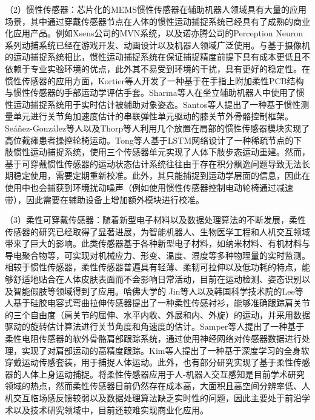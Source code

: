 （2）惯性传感器：芯片化的MEMS惯性传感器在辅助机器人领域具有大量的应用场景，其中通过穿戴传感器节点在人体的惯性运动捕捉系统已经具有了成熟的商业化应用产品。例如Xsens公司的MVN系统，以及诺亦腾公司的Perception Neuron系列动捕系统已经在游戏开发、动画设计以及机器人领域广泛使用。与基于摄像机的运动捕捉系统相比，惯性运动捕捉系统在保证捕捉精度前提下具有成本更低且不依赖于专业实验环境的优点，此外其不易受到环境的干扰，具有更好的稳定性。在惯性传感器的应用方面，Kortier等人\cite{kortierAssessmentHandKinematics2014}开发了一种基于在手指上附加柔性PCB结构与惯性传感器的手部运动学评估手套。Sharma等人\cite{sharmaBiomechanicalTrajectoryOptimization2022,sharmaPhysicalHumanRobotInteraction2022}在坐立辅助机器人中使用了惯性运动捕捉系统用于实时估计被辅助对象姿态。Santos等人\cite{dossantosIMUbasedTransparencyControl2022}提出了一种基于惯性测量单元进行关节角加速度估计的串联弹性单元驱动的膝关节外骨骼控制框架。Seáñez-González等人\cite{seanez-gonzalezStaticDynamicDecoding2017}以及Thorp等人\cite{thorpUpperBodyBasedPower2016d}利用几个放置在肩部的惯性传感器模块实现了高位截瘫患者操控轮椅运动。Tong等人\cite{tongLSTMBasedLowerLimbs2020}基于LSTM网络设计了一种稀疏节点的下肢惯性运动捕捉系统，使用三个传感器单元实现了人体下肢步态运动重建。然而，基于可穿戴惯性传感器的运动状态估计系统往往由于存在积分飘逸问题导致无法长期稳定使用，需要定期重新校准。此外，其只能捕捉到运动学层面的信息，因此在使用中也会捕获到环境扰动噪声（例如使用惯性传感器控制电动轮椅通过减速带），因此需要在辅助设备上增加额外模块进行校准。

（3）柔性可穿戴传感器：随着新型电子材料以及数据处理算法的不断发展，柔性传感器的研究已经取得了显著进展，为智能机器人、生物医学工程和人机交互领域带来了巨大的影响。此类传感器基于各种新型电子材料，如纳米材料、有机材料与导电聚合物等，可实现对机械应力、形变、温度、湿度等多种物理量的实时监测。相较于惯性传感器，柔性传感器普遍具有轻薄、柔韧可拉伸以及低功耗的特点，能够舒适地贴合在人体皮肤表面而不会影响日常活动，目前在运动检测、姿态识别以及智能假肢等领域得到了应用。哈佛大学的 Jin等人\cite{jinSoftSensingShirt2020}以及韩国科学技术院的Lee等人\cite{leePrintableSkinAdhesive2016}基于硅胶电容式弯曲拉伸传感器提出了一种柔性传感衬衫，能够准确跟踪肩关节的三个自由度（肩关节的屈伸、水平内收、外展和内、外旋）的运动，并采用数据驱动的旋转估计算法进行关节角度和角速度的估计。Samper等人\cite{samper-escuderoEfficientMultiaxialShoulderMotion2020}提出了一种基于柔性电阻传感器的软外骨骼肩部跟踪系统，通过使用神经网络对传感器数据进行处理，实现了对肩部运动的高精度跟踪。Kim等人\cite{kimDeepFullBodyMotion2019}提出了一种基于深度学习的全身软穿戴运动传感套装，用于捕捉人体运动。此外，也有部分研究\cite{contreras-gonzalezEfficientUpperLimb2020,ogataEstimatingMovementsHuman2019}实现了基于柔性传感器的人体上身运动捕捉。将柔性传感器应用于人-机器人交互感知是目前学术研究领域的热点，然而柔性传感器目前仍然存在成本高，大面积且高空间分辨率低、人机交互临场感反馈较弱以及数据处理算法缺乏实时性的问题，因此主要处于前沿学术以及技术研究领域中，目前还较难实现商业化应用。

